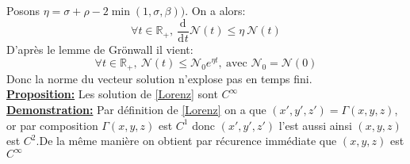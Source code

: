 \documentclass{article}
\newcommand{\R}{\mathbb{R}}
\newcommand{\deriv}[3][ ]{
    \ensuremath{\frac{\mathrm{d}^{#1}#2}{\mathrm{d}^{#1} #3}}
}
\begin{document}
Posons $ \eta = \sigma + \rho - 2 \min (1,\sigma,\beta))$. On a alors: 
\[
    \forall t \in \R_+, \  \deriv{}{t}\mathcal{N}(t) \le \eta\  \mathcal{N}(t)
\]
D'après le lemme de Grönwall il vient:
\[
    \forall t \in \R_+,\  \mathcal{N}(t) \le \mathcal{N}_0 e^{\eta t},\  \textrm{avec } \mathcal{N}_0 = \mathcal{N}(0)
\]
Donc la norme du vecteur solution n'explose pas en temps fini.\\

\underline{\textbf{Proposition:}} Les solution de \eqref{Lorenz} sont $C^\infty$\\

\underline{\textbf{Demonstration:}}
 Par définition de \eqref{Lorenz} on a que $(x',y',z') = \Gamma(x,y,z)$, or par composition $\Gamma(x,y,z)$ est $C^1$ donc $(x',y',z')$ l'est aussi ainsi $(x,y,z)$ est $C^2$.De la même manière on obtient par récurence immédiate que $(x,y,z)$ est $C^\infty$\\
\end{document}
